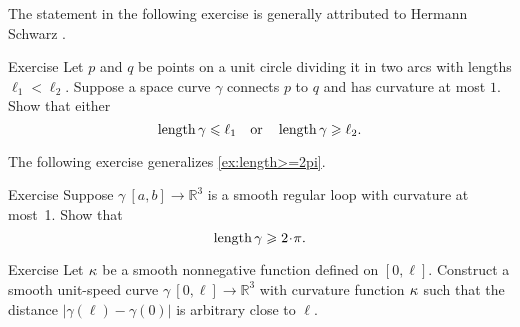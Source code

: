 The statement in the following exercise is generally attributed to Hermann Schwarz \cite{shur}.

\begin{thm}{Exercise}\label{ex:schwartz}
Let $p$ and $q$ be points on a unit circle dividing it in two arcs with lengths $\ell_1<\ell_2$.
Suppose a space curve $\gamma$ connects $p$ to $q$ and has curvature at most $1$.
Show that either
\[\mathop{\rm length}\nolimits \gamma\leqslant \ell_1
\quad\text{or}\quad
\mathop{\rm length}\nolimits \gamma\geqslant \ell_2.
\]
\end{thm}

The following exercise generalizes \ref{ex:length>=2pi}.

\begin{thm}{Exercise}\label{ex:loop}
Suppose $\gamma\:[a,b]\to \mathbb{R}^3$ is a smooth regular loop with curvature at most~1.
Show that 
\[\length\gamma\ge2\cdot\pi.\]

\end{thm}

\begin{thm}{Exercise}\label{ex:bow-upper}
Let $\kappa$ be a smooth nonnegative function defined on $[0,\ell]$.
Construct a smooth unit-speed curve $\gamma\:[0,\ell]\to\mathbb{R}^3$ with curvature function $\kappa$ such that the distance $|\gamma(\ell)-\gamma(0)|$ is arbitrary close to $\ell$.
\end{thm}
